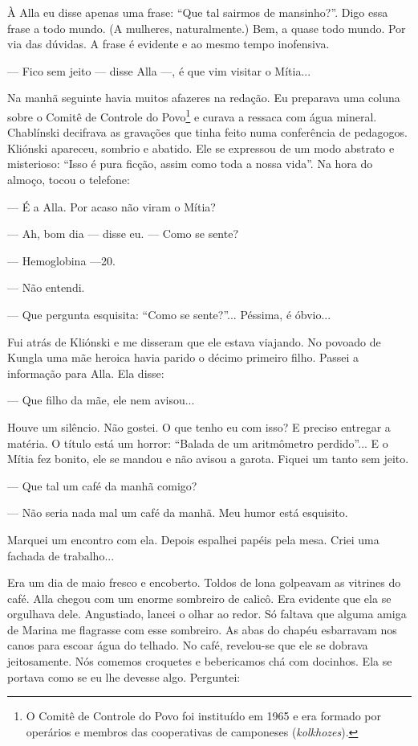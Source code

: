 À Alla eu disse apenas uma frase: ``Que tal sairmos de mansinho?''. Digo
essa frase a todo mundo. (A mulheres, naturalmente.) Bem, a quase todo
mundo. Por via das dúvidas. A frase é evidente e ao mesmo tempo
inofensiva.

--- Fico sem jeito --- disse Alla ---, é que vim visitar o Mítia...

Na manhã seguinte havia muitos afazeres na redação. Eu preparava uma
coluna sobre o Comitê de Controle do Povo\footnote{O Comitê de Controle
  do Povo foi instituído em 1965 e era formado por operários e membros
  das cooperativas de camponeses (\emph{kolkhozes}).} e curava a ressaca
com água mineral. Chablínski decifrava as gravações que tinha feito numa
conferência de pedagogos. Kliónski apareceu, sombrio e abatido. Ele se
expressou de um modo abstrato e misterioso: ``Isso é pura ficção, assim
como toda a nossa vida''. Na hora do almoço, tocou o telefone:

--- É a Alla. Por acaso não viram o Mítia?

--- Ah, bom dia --- disse eu. --- Como se sente?

--- Hemoglobina ---20.

--- Não entendi.

--- Que pergunta esquisita: ``Como se sente?''... Péssima, é óbvio...

Fui atrás de Kliónski e me disseram que ele estava viajando. No povoado
de Kungla uma mãe heroica havia parido o décimo primeiro filho. Passei a
informação para Alla. Ela disse:

--- Que filho da mãe, ele nem avisou...

Houve um silêncio. Não gostei. O que tenho eu com isso? E preciso
entregar a matéria. O título está um horror: ``Balada de um aritmômetro
perdido''... E o Mítia fez bonito, ele se mandou e não avisou a garota.
Fiquei um tanto sem jeito.

--- Que tal um café da manhã comigo?

--- Não seria nada mal um café da manhã. Meu humor está esquisito.

Marquei um encontro com ela. Depois espalhei papéis pela mesa. Criei uma
fachada de trabalho...

Era um dia de maio fresco e encoberto. Toldos de lona golpeavam as
vitrines do café. Alla chegou com um enorme sombreiro de calicô. Era
evidente que ela se orgulhava dele. Angustiado, lancei o olhar ao redor.
Só faltava que alguma amiga de Marina me flagrasse com esse sombreiro.
As abas do chapéu esbarravam nos canos para escoar água do telhado. No
café, revelou-se que ele se dobrava jeitosamente. Nós comemos croquetes
e bebericamos chá com docinhos. Ela se portava como se eu lhe devesse
algo. Perguntei:

